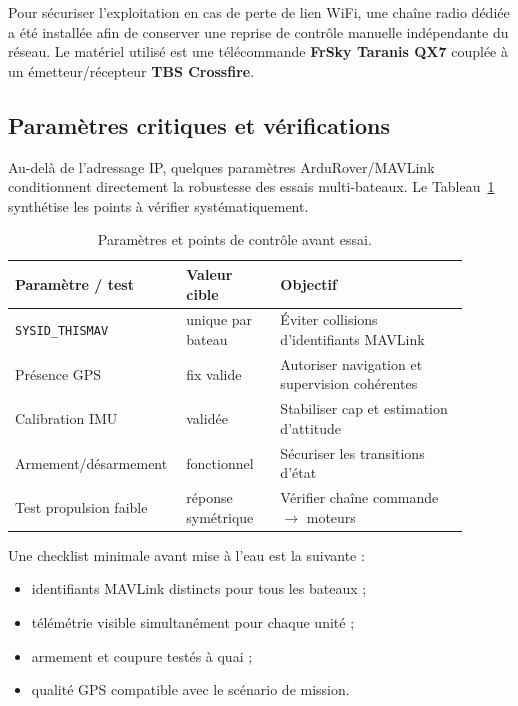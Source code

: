 Pour sécuriser l'exploitation en cas de perte de lien WiFi, une chaîne radio dédiée a été installée afin de conserver une reprise de contrôle manuelle indépendante du réseau. Le matériel utilisé est une télécommande \textbf{FrSky Taranis QX7} couplée à un émetteur/récepteur \textbf{TBS Crossfire}.

\subsection{Paramètres critiques et vérifications}

Au-delà de l'adressage IP, quelques paramètres ArduRover/MAVLink conditionnent directement la robustesse des essais multi-bateaux. Le Tableau~\ref{tab:parametres_blueboat} synthétise les points à vérifier systématiquement.

\begin{table}[h]
    \centering
    \caption{Paramètres et points de contrôle avant essai.}
    \label{tab:parametres_blueboat}
    \renewcommand{\arraystretch}{1.2}
    \begin{tabular}{p{0.30\linewidth} p{0.20\linewidth} p{0.40\linewidth}}
        \toprule
        \textbf{Paramètre / test} & \textbf{Valeur cible} & \textbf{Objectif} \\
        \midrule
        \texttt{SYSID\_THISMAV} & unique par bateau & Éviter collisions d'identifiants MAVLink \\
        Présence GPS & fix valide & Autoriser navigation et supervision cohérentes \\
        Calibration IMU & validée & Stabiliser cap et estimation d'attitude \\
        Armement/désarmement & fonctionnel & Sécuriser les transitions d'état \\
        Test propulsion faible & réponse symétrique & Vérifier chaîne commande $\rightarrow$ moteurs \\
        \bottomrule
    \end{tabular}
\end{table}

Une checklist minimale avant mise à l'eau est la suivante :
\begin{itemize}
    \item identifiants MAVLink distincts pour tous les bateaux ;
    \item télémétrie visible simultanément pour chaque unité ;
    \item armement et coupure testés à quai ;
    \item qualité GPS compatible avec le scénario de mission.
\end{itemize}

